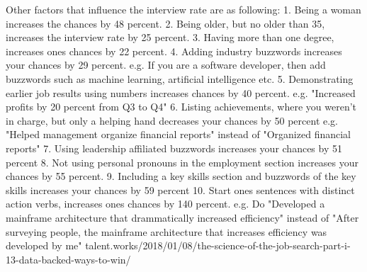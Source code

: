 Other factors that influence the interview rate are as following:
1. Being a woman increases the chances by 48 percent.
2. Being older, but no older than 35, increases the interview rate by 25 percent.
3. Having more than one degree, increases ones chances by 22 percent.
4. Adding industry buzzwords increases your chances by 29 percent.
   e.g. If you are a software developer, then add buzzwords such as machine learning,
   artificial intelligence etc.
5. Demonstrating earlier job results using numbers increases chances by 40 percent.
   e.g. "Increased profits by 20 percent from Q3 to Q4"
6. Listing achievements, where you weren't in charge, but only a helping hand
 decreases your chances by 50 percent
   e.g. "Helped management organize financial reports" instead of "Organized financial reports"
7. Using leadership affiliated buzzwords increases your chances by 51 percent
8. Not using personal pronouns in the employment section increases your
chances by 55 percent.
9. Including a key skills section and buzzwords of the key skills increases your
 chances by 59 percent
10. Start ones sentences with distinct action verbs, increases ones chances by 140 percent.
   e.g. Do "Developed a mainframe architecture that drammatically increased efficiency"
   instead of "After surveying people, the mainframe architecture that increases efficiency was
   developed by me"
talent.works/2018/01/08/the-science-of-the-job-search-part-i-13-data-backed-ways-to-win/






